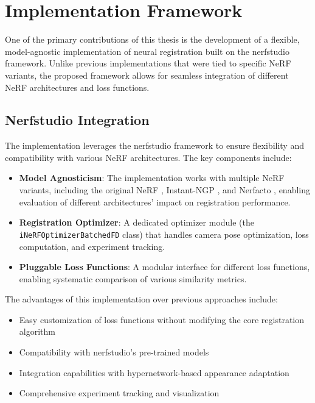 \section{Implementation Framework}

One of the primary contributions of this thesis is the development of a flexible, model-agnostic implementation of neural registration built on the nerfstudio framework. Unlike previous implementations that were tied to specific NeRF variants, the proposed framework allows for seamless integration of different NeRF architectures and loss functions.

\subsection{Nerfstudio Integration}

The implementation leverages the nerfstudio framework to ensure flexibility and compatibility with various NeRF architectures. The key components include:

\begin{itemize}
    \item \textbf{Model Agnosticism}: The implementation works with multiple NeRF variants, including the original NeRF \parencite{mildenhall2020nerf}, Instant-NGP \parencite{muller2022instant}, and Nerfacto \parencite{Tancik_2023}, enabling evaluation of different architectures' impact on registration performance.
    
    \item \textbf{Registration Optimizer}: A dedicated optimizer module (the \texttt{iNeRFOptimizerBatchedFD} class) that handles camera pose optimization, loss computation, and experiment tracking.
    
    \item \textbf{Pluggable Loss Functions}: A modular interface for different loss functions, enabling systematic comparison of various similarity metrics.
\end{itemize}

The advantages of this implementation over previous approaches include:
\begin{itemize}
    \item Easy customization of loss functions without modifying the core registration algorithm
    \item Compatibility with nerfstudio's pre-trained models
    \item Integration capabilities with hypernetwork-based appearance adaptation
    \item Comprehensive experiment tracking and visualization
\end{itemize}

